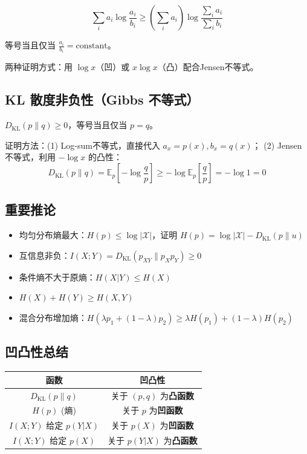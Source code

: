 \documentclass[12pt,a4paper]{ctexart}
\theoremstyle{definition}
\newcommand{\EE}{\mathbb{E}}
\newcommand{\XX}{\mathcal{X}}
\newcommand{\DKL}{D_{\mathrm{KL}}}
\begin{document}
\[
\sum_i a_i \log\frac{a_i}{b_i} \geq \left(\sum_i a_i\right) \log\frac{\sum_i a_i}{\sum_i b_i}
\]

等号当且仅当 $\frac{a_i}{b_i} = \mathrm{constant}$。

两种证明方式：用 $\log x$（凹）或 $x\log x$（凸）配合Jensen不等式。

\subsection{KL 散度非负性（Gibbs 不等式）}

$\DKL(p\|q) \geq 0$，等号当且仅当 $p=q$。

证明方法：(1) Log-sum不等式，直接代入 $a_x=p(x), b_x=q(x)$；
(2) Jensen不等式，利用 $-\log x$ 的凸性：
\[
\DKL(p\|q) = \EE_{p}\left[-\log\frac{q}{p}\right] \geq -\log\EE_p\left[\frac{q}{p}\right] = -\log 1 = 0
\]

\subsection{重要推论}

\begin{itemize}[nosep]
  \item 均匀分布熵最大：$H(p) \leq \log|\XX|$，证明 $H(p) = \log|\XX| - \DKL(p\|u)$
  \item 互信息非负：$I(X;Y) = \DKL(p_{XY}\|p_X p_Y) \geq 0$
  \item 条件熵不大于原熵：$H(X|Y) \leq H(X)$
  \item $H(X) + H(Y) \geq H(X,Y)$
  \item 混合分布增加熵：$H(\lambda p_1 + (1-\lambda)p_2) \geq \lambda H(p_1) + (1-\lambda)H(p_2)$
\end{itemize}

\subsection{凹凸性总结}

\begin{keybox}[凹凸性速查]
\begin{center}
\begin{tabular}{c|c}
\toprule
函数 & 凹凸性 \\
\midrule
$\DKL(p\|q)$ & 关于 $(p,q)$ 为\textbf{凸函数} \\
$H(p)$ (熵) & 关于 $p$ 为\textbf{凹函数} \\
$I(X;Y)$ 给定 $p(Y|X)$ & 关于 $p(X)$ 为\textbf{凹函数} \\
$I(X;Y)$ 给定 $p(X)$ & 关于 $p(Y|X)$ 为\textbf{凸函数} \\
\bottomrule
\end{tabular}
\end{center}
\end{keybox}
\end{document}
